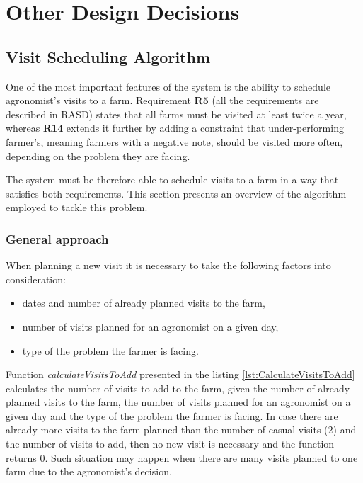 \section{Other Design Decisions}

\subsection{Visit Scheduling Algorithm}

One of the most important features of the system is the ability to schedule agronomist's visits to a farm. Requirement \textbf{R5} (all the requirements are described in RASD) states that all farms must be visited at least twice a year, whereas \textbf{R14} extends it further by adding a constraint that under-performing farmer's, meaning farmers with a negative note, should be visited more often, depending on the problem they are facing.

The system must be therefore able to schedule visits to a farm in a way that satisfies both requirements. This section presents an overview of the algorithm employed to tackle this problem.

\subsubsection*{General approach}

When planning a new visit it is necessary to take the following factors into consideration:
\begin{itemize}
    \item dates and number of already planned visits to the farm,
    \item number of visits planned for an agronomist on a given day,
    \item type of the problem the farmer is facing.
\end{itemize}

Function \textit{calculateVisitsToAdd} presented in the listing \ref{lst:CalculateVisitsToAdd} calculates the number of visits to add to the farm, given the number of already planned visits to the farm, the number of visits planned for an agronomist on a given day and the type of the problem the farmer is facing. In case there are already more visits to the farm planned than the number of casual visits (2) and the number of visits to add, then no new visit is necessary and the function returns 0. Such situation may happen when there are many visits planned to one farm due to the agronomist's decision.

